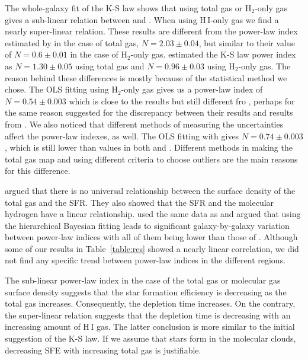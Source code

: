 The whole-galaxy fit of the K-S law shows that using total gas or H$_{2}$-only gas gives a sub-linear relation between \sigmasfr and \sigmatotalgas. When using  H\,{\sc I}-only gas we find a nearly super-linear relation. These results are different from the power-law index estimated by \citet{Ford13}  in the case of total gas, $N=2.03\pm0.04$, but similar to their value of $N=0.6\pm0.01$ in the case of H$_{2}$-only gas. 
\citet{Tabatabaei10} estimated the K-S law power index as $N=1.30\pm0.05$ using total gas and $N=0.96\pm0.03$ using H$_{2}$-only gas. The reason behind these differences is mostly because of the statistical method we chose. The OLS fitting using H$_{2}$-only gas gives us a power-law index of $N=0.54\pm0.003$ which is close to the \citet{Ford13} results but still different fro \citet{Tabatabaei10}, perhaps for the same reason \citet{Ford13} suggested for the discrepancy between their results and results from \citet{Tabatabaei10}. We also noticed that different methods of measuring the uncertainties affect the power-law indexes, as well. The OLS fitting with \sigmatotalgas gives $N=0.74\pm0.003$, which is still lower than values in both  \citet{Tabatabaei10} and  \citet{Ford13}. Different methods in making the total gas map and using different criteria to choose outliers are the main reasons for this difference.

 \citet{Bigiel08} argued that there is no universal relationship between the surface density of the total gas and the SFR. They also showed that the SFR and the molecular hydrogen have a linear relationship. \citet{Shetty13} used the same data as \citet{Bigiel08} and argued that using the hierarchical Bayesian fitting leads to significant galaxy-by-galaxy variation between power-law indices with all of them being lower than those of \citet{Bigiel08}. Although some of our results in Table~\ref{table:res} showed a nearly linear correlation, we did not find any specific trend between power-law indices in the different regions.

The sub-linear power-law index in the case of the total gas or molecular gas surface density suggests that the star formation efficiency is decreasing as the total gas increases. Consequently, the depletion time increases. On the contrary, the super-linear relation suggests that the depletion time is decreasing with an increasing amount of H\,{\sc I} gas. The latter conclusion is more similar to the initial suggestion of the K-S law. If we assume that stars form in the molecular clouds, decreasing SFE with increasing total gas is justifiable.

